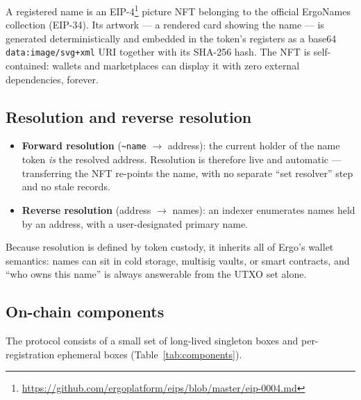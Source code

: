 \documentclass[11pt]{article}
\newcommand{\name}[1]{\texttt{\textasciitilde#1}}
\newcommand{\code}[1]{\texttt{#1}}
\begin{document}
A registered name is an
EIP-4\footnote{\url{https://github.com/ergoplatform/eips/blob/master/eip-0004.md}}
picture NFT belonging to the official ErgoNames collection (EIP-34). Its
artwork --- a rendered card showing the name --- is generated
deterministically and embedded in the token's registers as a base64
\code{data:image/svg+xml} URI together with its SHA-256 hash. The NFT is
self-contained: wallets and marketplaces can display it with zero external
dependencies, forever.

\subsection{Resolution and reverse resolution}

\begin{itemize}
  \item \textbf{Forward resolution} (\name{name} $\rightarrow$ address): the
        current holder of the name token \emph{is} the resolved address.
        Resolution is therefore live and automatic --- transferring the NFT
        re-points the name, with no separate ``set resolver'' step and no
        stale records.
  \item \textbf{Reverse resolution} (address $\rightarrow$ names): an indexer
        enumerates names held by an address, with a user-designated primary
        name.
\end{itemize}

Because resolution is defined by token custody, it inherits all of Ergo's
wallet semantics: names can sit in cold storage, multisig vaults, or smart
contracts, and ``who owns this name'' is always answerable from the UTXO set
alone.

\subsection{On-chain components}

The protocol consists of a small set of long-lived singleton boxes and
per-registration ephemeral boxes (Table~\ref{tab:components}).
\end{document}
